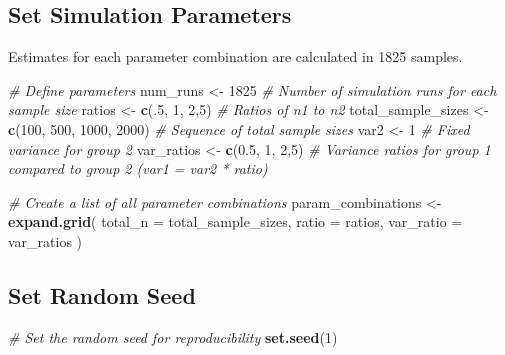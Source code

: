 \documentclass[
  letterpaper,
  DIV=11,
  numbers=noendperiod]{scrartcl}
\newenvironment{Shaded}{\begin{snugshade}}{\end{snugshade}}
\newcommand{\AttributeTok}[1]{\textcolor[rgb]{0.13,0.29,0.53}{#1}}
\newcommand{\CommentTok}[1]{\textcolor[rgb]{0.56,0.35,0.01}{\textit{#1}}}
\newcommand{\DecValTok}[1]{\textcolor[rgb]{0.00,0.00,0.81}{#1}}
\newcommand{\FloatTok}[1]{\textcolor[rgb]{0.00,0.00,0.81}{#1}}
\newcommand{\FunctionTok}[1]{\textcolor[rgb]{0.13,0.29,0.53}{\textbf{#1}}}
\newcommand{\NormalTok}[1]{#1}
\newcommand{\OtherTok}[1]{\textcolor[rgb]{0.56,0.35,0.01}{#1}}
\begin{document}
\subsection{Set Simulation Parameters}\label{set-simulation-parameters}

Estimates for each parameter combination are calculated in 1825 samples.

\begin{Shaded}
\begin{Highlighting}[]
\CommentTok{\# Define parameters}
\NormalTok{num\_runs }\OtherTok{\textless{}{-}} \DecValTok{1825}  \CommentTok{\# Number of simulation runs for each sample size}
\NormalTok{ratios }\OtherTok{\textless{}{-}} \FunctionTok{c}\NormalTok{(.}\DecValTok{5}\NormalTok{, }\DecValTok{1}\NormalTok{, }\DecValTok{2}\NormalTok{,}\DecValTok{5}\NormalTok{)  }\CommentTok{\# Ratios of n1 to n2}
\NormalTok{total\_sample\_sizes }\OtherTok{\textless{}{-}} \FunctionTok{c}\NormalTok{(}\DecValTok{100}\NormalTok{, }\DecValTok{500}\NormalTok{, }\DecValTok{1000}\NormalTok{, }\DecValTok{2000}\NormalTok{)  }\CommentTok{\# Sequence of total sample sizes}
\NormalTok{var2 }\OtherTok{\textless{}{-}} \DecValTok{1}  \CommentTok{\# Fixed variance for group 2}
\NormalTok{var\_ratios }\OtherTok{\textless{}{-}} \FunctionTok{c}\NormalTok{(}\FloatTok{0.5}\NormalTok{, }\DecValTok{1}\NormalTok{, }\DecValTok{2}\NormalTok{,}\DecValTok{5}\NormalTok{)  }\CommentTok{\# Variance ratios for group 1 compared to group 2 (var1 = var2 * ratio)}

\CommentTok{\# Create a list of all parameter combinations}
\NormalTok{param\_combinations }\OtherTok{\textless{}{-}} \FunctionTok{expand.grid}\NormalTok{(}
  \AttributeTok{total\_n =}\NormalTok{ total\_sample\_sizes,}
  \AttributeTok{ratio =}\NormalTok{ ratios,}
  \AttributeTok{var\_ratio =}\NormalTok{ var\_ratios}
\NormalTok{)}
\end{Highlighting}
\end{Shaded}

\subsection{Set Random Seed}\label{set-random-seed}

\begin{Shaded}
\begin{Highlighting}[]
\CommentTok{\# Set the random seed for reproducibility}
\FunctionTok{set.seed}\NormalTok{(}\DecValTok{1}\NormalTok{)}
\end{Highlighting}
\end{Shaded}
\end{document}
